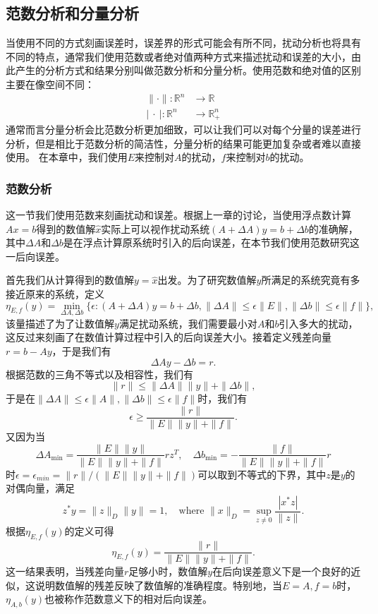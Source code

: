 \documentclass[a4paper,10pt]{ctexart}
\begin{document}
\subsection{范数分析和分量分析}
当使用不同的方式刻画误差时，误差界的形式可能会有所不同，扰动分析也将具有不同的特点，通常我们使用范数或者绝对值两种方式来描述扰动和误差的大小，由此产生的分析方式和结果分别叫做范数分析和分量分析。使用范数和绝对值的区别主要在像空间不同：
\[
    \begin{aligned}
        \| \cdot \| : \mathbb{R}^n &\to \mathbb{R} \\
        \left\vert\ \cdot \ \right\vert : \mathbb{R}^n &\to \mathbb{R}^n_+
    \end{aligned}
\]
通常而言分量分析会比范数分析更加细致，可以让我们可以对每个分量的误差进行分析，但是相比于范数分析的简洁性，分量分析的结果可能更加复杂或者难以直接使用。
在本章中，我们使用$ E $来控制对$ A $的扰动，$ f $来控制对$ b $的扰动。

\subsubsection{范数分析}\label{sec:norm_analysis}
这一节我们使用范数来刻画扰动和误差。根据上一章的讨论，当使用浮点数计算$ Ax=b $得到的数值解$ \hat{x} $实际上可以视作扰动系统$ (A+\Delta A)y = b+\Delta b $的准确解，其中$ \Delta A $和$ \Delta b $是在浮点计算原系统时引入的后向误差，在本节我们使用范数研究这一后向误差。

首先我们从计算得到的数值解$ y=\hat{x} $出发。为了研究数值解$ y $所满足的系统究竟有多接近原来的系统，定义
\begin{equation}
    \eta_{E,f}(y) = \min_{\Delta A, \Delta b}\{ \epsilon: (A+\Delta A)y = b+\Delta b, \| \Delta A \|\leqslant \epsilon \| E \| , \| \Delta b \| \leqslant \epsilon \| f \| \},
\end{equation}
该量描述了为了让数值解$ y $满足扰动系统，我们需要最小对$ A $和$ b $引入多大的扰动，这反过来刻画了在数值计算过程中引入的后向误差大小。接着定义残差向量$ r = b - A y $，于是我们有
\[
    \Delta A y - \Delta b = r.
\]
根据范数的三角不等式以及相容性，我们有
\[
    \| r \| \leqslant \| \Delta A \| \| y \| + \| \Delta b \|,
\]
于是在$ \| \Delta A \|\leqslant \epsilon \| A \| , \| \Delta b \| \leqslant \epsilon \| f \| $时，我们有
\[
    \epsilon \geqslant \frac{\| r \|}{\| E \| \| y \| + \| f \|}.
\]
又因为当
\[
    \Delta A_{\min} = \frac{\| E \| \| y \|}{\| E \| \| y \| + \| f \| }rz^T, \quad \Delta b_{\min} = -\frac{\| f \|}{\| E \| \| y \| + \| f \| }r
\]
时$ \epsilon = \epsilon_{min} = \| r \|/(\| E \| \| y \| + \| f \|) $可以取到不等式的下界，其中$ z $是$ y $的对偶向量，满足
\[
    z^* y = \| z \|_D \| y \| = 1,\quad \text{where } \| x \|_D = \sup_{z\ne 0} \frac{|x^*z|}{\| z \| }.
\]
根据$ \eta_{E,f}(y) $的定义可得
\begin{equation}
    \eta_{E,f}(y) = \frac{\| r \|}{\| E \| \| y \| + \| f \|}.
\end{equation}
这一结果表明，当残差向量$ r $足够小时，数值解$ y $在后向误差意义下是一个良好的近似，这说明数值解的残差反映了数值解的准确程度。特别地，当$ E=A,f=b $时，$ \eta_{A,b}(y) $也被称作范数意义下的相对后向误差。
\end{document}

